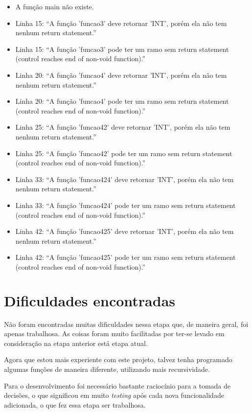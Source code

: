 \documentclass[12pt]{article}
\begin{document}
\begin{itemize}
	\item A função main não existe.
	\item Linha 15: ``A função 'funcao3' deve retornar 'INT', porém ela não tem nenhum return statement.''
	\item Linha 15: ``A função 'funcao3' pode ter um ramo sem return statement (control reaches end of non-void function).''
	\item Linha 20: ``A função 'funcao4' deve retornar 'INT', porém ela não tem nenhum return statement.''
	\item Linha 20: ``A função 'funcao4' pode ter um ramo sem return statement (control reaches end of non-void function).''
	\item Linha 25: ``A função 'funcao42' deve retornar 'INT', porém ela não tem nenhum return statement.''
	\item Linha 25: ``A função 'funcao42' pode ter um ramo sem return statement (control reaches end of non-void function).''
	\item Linha 33: ``A função 'funcao424' deve retornar 'INT', porém ela não tem nenhum return statement.''
	\item Linha 33: ``A função 'funcao424' pode ter um ramo sem return statement (control reaches end of non-void function).''
	\item Linha 42: ``A função 'funcao425' deve retornar 'INT', porém ela não tem nenhum return statement.''
	\item Linha 42: ``A função 'funcao425' pode ter um ramo sem return statement (control reaches end of non-void function).''\\

\end{itemize}

\section{Dificuldades encontradas}

\indent

Não foram encontradas muitas dificuldades nessa etapa que, de maneira geral, foi apenas trabalhosa. As coisas foram muito facilitadas por ter-se levado em consideração na etapa anterior está etapa atual.

Agora que estou mais experiente com este projeto, talvez tenha programado algumas funções de maneira diferente, utilizando mais recursividade.

Para o desenvolvimento foi necessário bastante raciocínio para a tomada de decisões, o que significou em muito \textit{testing} após cada nova funcionalidade adicionada, o que fez essa etapa ser trabalhosa.



\end{document}
